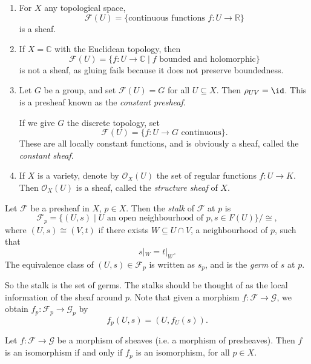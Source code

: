 \documentclass[12pt]{article}
\begin{document}
\begin{exbox}
	\begin{enumerate}
		\item For $X$ any topological space,
			\[
				\mathcal{F}(U) = \{ \text{continuous functions } f : U \to \mathbb{R}\}
			\]
			is a sheaf.
		\item If $X = \mathbb{C}$ with the Euclidean topology, then
			\[
				\mathcal{F}(U) = \{f : U \to \mathbb{C} \mid f \text{ bounded and holomorphic}\}
			\]
			is not a sheaf, as gluing fails because it does not preserve boundedness.
		\item Let $G$ be a group, and set $\mathcal{F}(U) = G$ for all $U \subseteq X$. Then $\rho_{UV} = \id$. This is a presheaf known as the \emph{constant presheaf}.

			If we give $G$ the discrete topology, set
			\[
				\mathcal{F}(U) = \{f : U \to G \text{ continuous}\}.
			\]
			These are all locally constant functions, and is obviously a sheaf, called the \emph{constant sheaf}.
		\item If $X$ is a variety, denote by $\mathcal{O}_X(U)$ the set of regular functions $f : U \to K$. Then $\mathcal{O}_X(U)$ is a sheaf, called the \emph{structure sheaf} of $X$.
	\end{enumerate}
\end{exbox}

\begin{definition}
	Let $\mathcal{F}$ be a presheaf in $X$, $p \in X$. Then the \emph{stalk} of $\mathcal{F}$ at $p$ is
	\[
		\mathcal{F}_p = \{(U, s) \mid U \text{ an open neighbourhood of } p, s \in F(U)\}/ \cong,
	\]
	where $(U, s) \cong (V, t)$ if there exists $W \subseteq U \cap V$, a neighbourhood of $p$, such that
	\[
	s|_W = t|_W.
	\]
	The equivalence class of $(U, s) \in \mathcal{F}_p$ is written as $s_p$, and is the \emph{germ} of $s$ at $p$.
\end{definition}

So the stalk is the set of germs. The stalks should be thought of as the local information of the sheaf around $p$. Note that given a morphism $f : \mathcal{F} \to \mathcal{G}$, we obtain $f_p : \mathcal{F}_p \to \mathcal{G}_p$ by
\[
f_p(U, s) = (U, f_U(s)).
\]

\begin{proposition}
	Let $f : \mathcal{F} \to \mathcal{G}$ be a morphism of sheaves (i.e. a morphism of presheaves). Then $f$ is an isomorphism if and only if $f_p$ is an isomorphism, for all $p \in X$.
\end{proposition}
\end{document}

